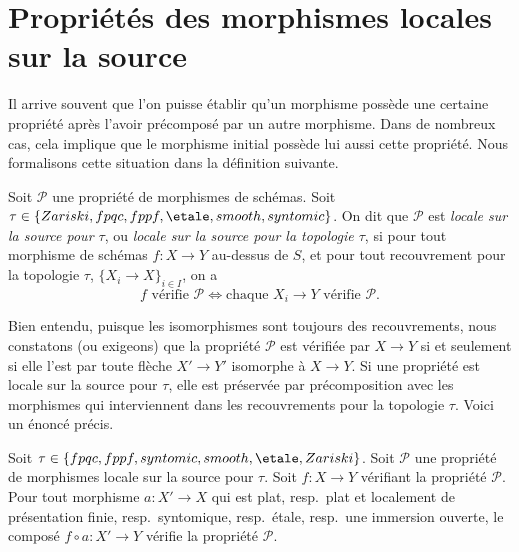 














\section{Propriétés des morphismes locales sur la source}
\label{section-properties-morphisms-local-source}

\noindent
Il arrive souvent que l'on puisse établir qu'un morphisme possède une certaine
propriété après l'avoir précomposé par un autre morphisme. Dans de nombreux cas,
cela implique que le morphisme initial possède lui aussi cette propriété.
Nous formalisons cette situation dans la définition suivante.

\begin{definition}
\label{definition-property-morphisms-local-source}
Soit $\mathcal{P}$ une propriété de morphismes de schémas.
Soit $\tau \in \{Zariski, \linebreak[0] fpqc, \linebreak[0] fppf, \linebreak[0]
\etale, \linebreak[0] smooth, \linebreak[0] syntomic\}$.
On dit que $\mathcal{P}$ est
{\it locale sur la source pour $\tau$}, ou
{\it locale sur la source pour la topologie $\tau$}, si pour tout
morphisme de schémas $f : X \to Y$ au-dessus de $S$, et pour tout
recouvrement pour la topologie $\tau$, $\{X_i \to X\}_{i \in I}$, on a
$$
f \text{ vérifie }\mathcal{P}
\Leftrightarrow
\text{chaque }X_i \to Y\text{ vérifie }\mathcal{P}.
$$
\end{definition}

\noindent
Bien entendu, puisque les isomorphismes sont toujours des recouvrements,
nous constatons (ou exigeons) que la propriété $\mathcal{P}$ est vérifiée par
$X \to Y$ si et seulement si elle l'est par toute flèche $X' \to Y'$
isomorphe à $X \to Y$. Si une propriété est locale sur la source pour $\tau$,
elle est préservée par précomposition avec les morphismes qui interviennent
dans les recouvrements pour la topologie $\tau$. Voici un énoncé précis.

\begin{lemma}
\label{lemma-precompose-property-local-source}
Soit $\tau \in \{fpqc, fppf, syntomic, smooth, \etale, Zariski\}$.
Soit $\mathcal{P}$ une propriété de morphismes locale sur la source pour
$\tau$. Soit $f : X \to Y$ vérifiant la propriété $\mathcal{P}$.
Pour tout morphisme $a : X' \to X$ qui est
plat, resp.\ plat et localement de présentation finie, resp.\ syntomique,
resp.\ \'etale, resp.\ une immersion ouverte, le composé
$f \circ a : X' \to Y$ vérifie la propriété $\mathcal{P}$.
\end{lemma}

